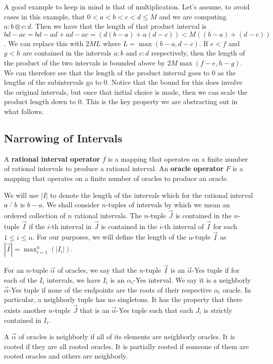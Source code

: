 \documentclass[12pt]{article}
\begin{document}
A good example to keep in mind is that of multiplication. Let's assume, to avoid cases in this example, that  $0 < a < b < c < d \leq M$ and we are computing $a:b \otimes c:d$. Then we have that the length of that product interval is $bd-ac = bd-ad+ad - ac= (d(b-a) + a(d-c))< M ( ( b-a) + (d-c) )$. We can replace this with $2ML$ where $L = \max(b-a, d-c)$. If $e\lt f$ and $g\lt h$ are contained in the intervals $a:b$ and $c:d$ respectively, then the length of the product of the two intervals is bounded above by $2M\max(f-e, h-g)$. We can therefore see that the length of the product interval goes to 0 as the lengths of the subintervals go to 0. Notice that the bound for this does involve the original intervals, but once that initial choice is made, then we can scale the product length down to 0. This is the key property we are abstracting out in what follows. 

\subsection{Narrowing of Intervals}\label{sec:nrwint}

A \textbf{rational interval operator} $f$ is a mapping that operates on a finite number of rational intervals to produce a rational interval. An \textbf{oracle operator} $F$ is a mapping that operates on a finite number of oracles to produce an oracle.

We will use $|I|$ to denote the length of the intervals which for the rational interval $a\lte b$ is $b-a$. We shall consider $n$-tuples of intervals by which we mean an ordered collection of $n$ rational intervals. The $n$-tuple $\vec{J}$ is contained in the $n$-tuple $\vec{I}$ if the $i$-th interval in $\vec{J}$ is contained in the $i$-th interval of $\vec{I}$ for each $1 \leq i \leq n$. For our purposes, we will define the length of the $n$-tuple $\vec{I}$ as $|\vec{I}| = \max_{i=1}^n (|I_i|)$.

For an $n$-tuple $\vec{\alpha}$ of oracles, we say that the $n$-tuple $\vec{I}$ is an $\vec{\alpha}$-Yes tuple if for each of the $I_i$ intervals, we have $I_i$ is an $\alpha_i$-Yes interval. We say it is a neighborly $\vec{\alpha}$-Yes tuple if none of the endpoints are the roots of their respective $\alpha_i$ oracle. In particular, a neighborly tuple has no singletons. It has the property that there exists another $n$-tuple $\vec{J}$ that is an $\vec{\alpha}$-Yes tuple such that each $J_i$ is strictly contained in $I_i$. 

A $\vec{\alpha}$ of oracles is neighborly if all of its elements are neighborly oracles. It is rooted if they are all rooted oracles. It is partially rooted if someone of them are rooted oracles and others are neighborly. 
\end{document}
